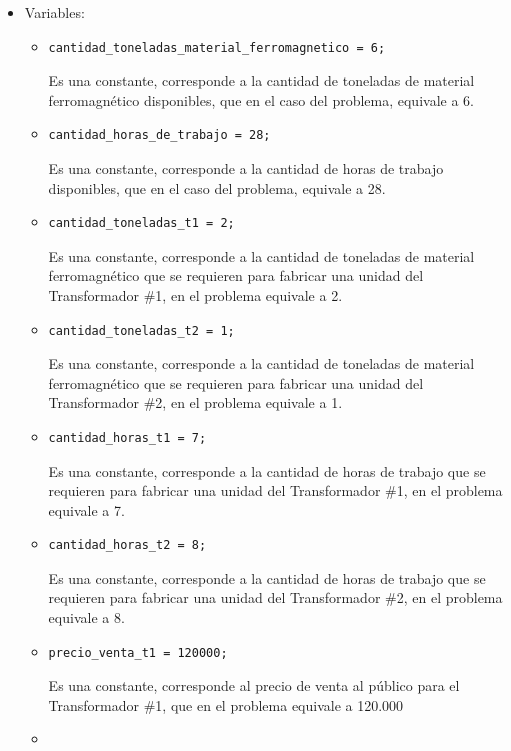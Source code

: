 \documentclass[12pt]{article}
\begin{document}
\begin{enumerate}[label=\alph*]
\begin{itemize}
\item Variables: 
\begin{itemize}
\item \begin{verbatim}
cantidad_toneladas_material_ferromagnetico = 6;
\end{verbatim}
Es una constante, corresponde a la cantidad de toneladas de material ferromagnético disponibles, que en el caso del problema, equivale a 6.
\item \begin{verbatim}
cantidad_horas_de_trabajo = 28;
\end{verbatim}
Es una constante, corresponde a la cantidad de horas de trabajo disponibles, que en el caso del problema, equivale a 28.
\item \begin{verbatim}
cantidad_toneladas_t1 = 2;
\end{verbatim}
Es una constante, corresponde a la cantidad de toneladas de material ferromagnético que se requieren para fabricar una unidad del Transformador \#1, en el problema equivale a 2.
\item \begin{verbatim}
cantidad_toneladas_t2 = 1;
\end{verbatim}
Es una constante, corresponde a la cantidad de toneladas de material ferromagnético que se requieren para fabricar una unidad del Transformador \#2, en el problema equivale a 1.
\item \begin{verbatim}
cantidad_horas_t1 = 7;
\end{verbatim}
Es una constante, corresponde a la cantidad de horas de trabajo que se requieren para fabricar una unidad del Transformador \#1, en el problema equivale a 7.
\item \begin{verbatim}
cantidad_horas_t2 = 8;
\end{verbatim}
Es una constante, corresponde a la cantidad de horas de trabajo que se requieren para fabricar una unidad del Transformador \#2, en el problema equivale a 8.
\item \begin{verbatim}
precio_venta_t1 = 120000;
\end{verbatim}
Es una constante, corresponde al precio de venta al público para el Transformador \#1, que en el problema equivale a 120.000
\item \begin{verbatim}

\end{verbatim}
\end{itemize}
\end{itemize}
\end{enumerate}
\end{document}
